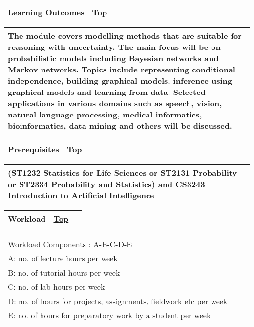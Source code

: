 { }

\begin{longtable}[]{@{}ll@{}}
\toprule
{\protect\hypertarget{Learningux20Outcomes}{}{}Learning Outcomes} &
{\protect\hyperlink{top}{Top}~~}\tabularnewline
\bottomrule
\end{longtable}

\begin{longtable}[]{@{}l@{}}
\toprule
\protect\hypertarget{ctl00_ctl00_ContentPlaceHolder1_ContentPlaceHolder1_LV_CourseInfo_ctrl0_lblCourseInfo}{}{The
module covers modelling methods that are suitable for reasoning with
uncertainty. The main focus will be on probabilistic models including
Bayesian networks and Markov networks. Topics include representing
conditional independence, building graphical models, inference using
graphical models and learning from data. Selected applications in
various domains such as speech, vision, natural language processing,
medical informatics, bioinformatics, data mining and others will be
discussed.}\tabularnewline
\bottomrule
\end{longtable}

\begin{longtable}[]{@{}ll@{}}
\toprule
{\protect\hypertarget{Prerequisites}{}{}Prerequisites} &
{\protect\hyperlink{top}{Top}~~}\tabularnewline
\bottomrule
\end{longtable}

\begin{longtable}[]{@{}l@{}}
\toprule
\protect\hypertarget{ctl00_ctl00_ContentPlaceHolder1_ContentPlaceHolder1_LV_CourseInfo_ctrl1_lblCourseInfo}{}{(ST1232
Statistics for Life Sciences or ST2131 Probability or ST2334 Probability
and Statistics) and CS3243 Introduction to Artificial
Intelligence}\tabularnewline
\bottomrule
\end{longtable}

\begin{longtable}[]{@{}ll@{}}
\toprule
{\protect\hypertarget{Workload}{}{}Workload} &
{\protect\hyperlink{top}{Top}~~}\tabularnewline
\bottomrule
\end{longtable}

\begin{longtable}[]{@{}l@{}}
\toprule
\protect\hypertarget{ctl00_ctl00_ContentPlaceHolder1_ContentPlaceHolder1_LV_CourseInfo_ctrl2_lblCourseInfo}{}{3-0-0-3-4\\[2\baselineskip]Workload
Components : A-B-C-D-E\\
A: no. of lecture hours per week\\
B: no. of tutorial hours per week\\
C: no. of lab hours per week\\
D: no. of hours for projects, assignments, fieldwork etc per week\\
E: no. of hours for preparatory work by a student per
week}\tabularnewline
\bottomrule
\end{longtable}

